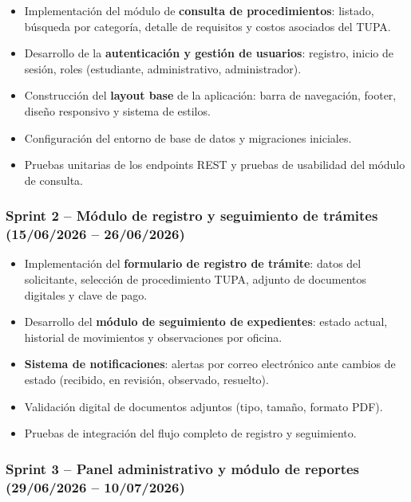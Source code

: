 \begin{itemize}
  \item Implementación del módulo de \textbf{consulta de procedimientos}: listado,
    búsqueda por categoría, detalle de requisitos y costos asociados del TUPA.
  \item Desarrollo de la \textbf{autenticación y gestión de usuarios}: registro,
    inicio de sesión, roles (estudiante, administrativo, administrador).
  \item Construcción del \textbf{layout base} de la aplicación: barra de
    navegación, footer, diseño responsivo y sistema de estilos.
  \item Configuración del entorno de base de datos y migraciones iniciales.
  \item Pruebas unitarias de los endpoints REST y pruebas de usabilidad del
    módulo de consulta.
\end{itemize}

\subsubsection{Sprint 2 -- Módulo de registro y seguimiento de trámites
(15/06/2026 -- 26/06/2026)}

\begin{itemize}
  \item Implementación del \textbf{formulario de registro de trámite}: datos del
    solicitante, selección de procedimiento TUPA, adjunto de documentos digitales
    y clave de pago.
  \item Desarrollo del \textbf{módulo de seguimiento de expedientes}: estado
    actual, historial de movimientos y observaciones por oficina.
  \item \textbf{Sistema de notificaciones}: alertas por correo electrónico ante
    cambios de estado (recibido, en revisión, observado, resuelto).
  \item Validación digital de documentos adjuntos (tipo, tamaño, formato PDF).
  \item Pruebas de integración del flujo completo de registro y seguimiento.
\end{itemize}

\subsubsection{Sprint 3 -- Panel administrativo y módulo de reportes
(29/06/2026 -- 10/07/2026)}

